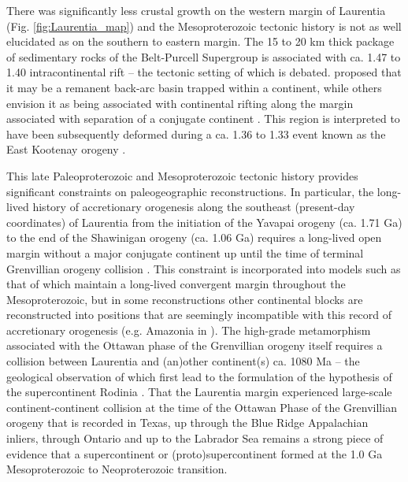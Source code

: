 \documentclass[11pt,letterpaper]{article}
\begin{document}
There was significantly less crustal growth on the western margin of Laurentia (Fig. \ref{fig:Laurentia_map}) and the Mesoproterozoic tectonic history is not as well elucidated as on the southern to eastern margin. The 15 to 20 km thick package of sedimentary rocks of the Belt-Purcell Supergroup is associated with ca. 1.47 to 1.40 intracontinental rift -- the tectonic setting of which is debated. \citet{Hoffman1989a} proposed that it may be a remanent back-arc basin trapped within a continent, while others envision it as being associated with continental rifting along the margin associated with separation of a conjugate continent \citep[e.g.]{Jones2015a}. This region is interpreted to have been subsequently deformed during a ca. 1.36 to 1.33 event known as the East Kootenay orogeny \citep{McMechan1982a, Nesheim2012a, McFarlane2015a}. 

This late Paleoproterozoic and Mesoproterozoic tectonic history provides significant constraints on paleogeographic reconstructions. In particular, the long-lived history of accretionary orogenesis along the southeast (present-day coordinates) of Laurentia from the initiation of the Yavapai orogeny (ca. 1.71 Ga) to the end of the Shawinigan orogeny (ca. 1.06 Ga) requires a long-lived open margin without a major conjugate continent up until the time of terminal Grenvillian orogeny collision \citep{Karlstrom2001a}. This constraint is incorporated into models such as that of \citet{Pehrsson2015a} which maintain a long-lived convergent margin throughout the Mesoproterozoic, but in some reconstructions other continental blocks are reconstructed into positions that are seemingly incompatible with this record of accretionary orogenesis (e.g. Amazonia in \citealp{Elming2009a}). The high-grade metamorphism associated with the Ottawan phase of the Grenvillian orogeny itself requires a collision between Laurentia and (an)other continent(s) ca. 1080 Ma -- the geological observation of which first lead to the formulation of the hypothesis of the supercontinent Rodinia \citep{Hoffman1991a}. That the Laurentia margin experienced large-scale continent-continent collision at the time of the Ottawan Phase of the Grenvillian orogeny that is recorded in Texas, up through the Blue Ridge Appalachian inliers, through Ontario and up to the Labrador Sea remains a strong piece of evidence that a supercontinent or (proto)supercontinent formed at the 1.0 Ga Mesoproterozoic to Neoproterozoic transition.
\end{document}
